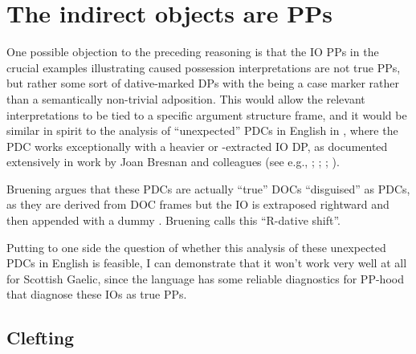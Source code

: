 \documentclass[output=paper,colorlinks,citecolor=brown]{langscibook}
\begin{document}
\section{The indirect objects are PPs}\label{gt:pps4}

One possible objection to the preceding reasoning is that the IO PPs in the crucial examples illustrating caused possession interpretations are not true PPs, but rather some sort of dative-marked DPs with the  being a case marker rather than a semantically non-trivial adposition. This would allow the relevant interpretations to be tied to a specific argument structure frame, and it would be similar in spirit to the analysis of ``unexpected'' PDCs in English in \citet{gt:Bruening:2010b}, where the PDC works exceptionally with a heavier or -extracted IO DP, as documented extensively in work by Joan Bresnan and colleagues (see e.g., \citealt{gt:Bresnan:2007b}; \citealt{gt:Bresnan:2007a}; \citealt{gt:Bresnan:2008}; \citealt{gt:Bresnan:2009}).

\ea  \label{bre1}
\z
\z

\ea \label{gt:in1z}
\z
\z

\noindent Bruening argues that these PDCs are actually ``true'' DOCs ``disguised'' as PDCs, as they are derived from DOC frames but the IO is extraposed rightward and then appended with a dummy . Bruening calls this ``R-dative shift''. 

Putting to one side the question of whether this analysis of these unexpected PDCs in English is  feasible, I can demonstrate that it won't work very well at all for Scottish Gaelic, since the language has some reliable diagnostics for PP-hood that diagnose these IOs as true PPs. 

\subsection{Clefting}
\end{document}
